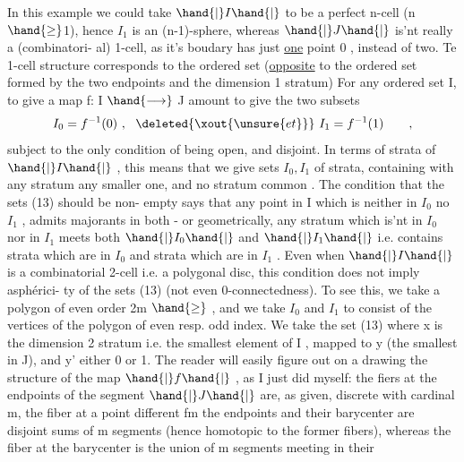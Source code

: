 In this example we could take $\hand{|}I\hand{|}$ to be a perfect n-cell (n$\hand{\geq}$1),
hence  $I_1$  is an (n-1)-sphere,  whereas $\hand{|}J\hand{|}$ is'nt really a (combinatori-%
al) 1-cell,  as it's boudary has just \uline{one} point 0 ,  instead of two.
Te 1-cell structure corresponds to the ordered set (\uline{opposite} to the
ordered set formed by the two endpoints and the dimension 1 stratum)
\diagram{\[ J = \begin{tikzcd}[row sep=small, column sep=small] & \over{y}{y} \ar[color=blue,dl] \ar[color=blue,dr] & \\ \over[typed]{0}{0} & & 1 \end{tikzcd} \quad . \]}
For any ordered set I,  to give a map  f: I $\hand{\longrightarrow}$ J  amount to give
the two subsets
\[ I_0 = f^{-1}(0) \ , \ \ \deleted{\xout{\unsure{et}}}\ I_1 = f^{-1}(1) \qquad , \]
subject to the only condition of being open,  and disjoint.  In terms
of strata of $\hand{|}I\hand{|}$ ,  this means that we give  sets $I_0,I_1$ of strata,
containing with any stratum any smaller one,  and  no stratum 
common .  The condition that the sets (13) should be non-%
empty says that any point in I which is neither in $I_0$ no $I_1$ , admits
majorants in both  -  or geometrically,  any stratum which is'nt in
$I_0$ nor in $I_1$ meets both $\hand{|}I_0\hand{|}$ and $\hand{|}I_1\hand{|}$ i.e. contains strata which are
in $I_0$ and strata which are in $I_1$ .   Even when $\hand{|}I\hand{|}$ is a combinatorial
2-cell i.e. a polygonal disc,  this condition does not imply asphérici-%
ty of the sets (13) (not even 0-connectedness).  To see this,  we take
a polygon of even order 2m $\hand{\geq}$ ,  and we take  $I_0$ and $I_1$ to consist
of the vertices of the polygon of even resp. odd index.  We take the
set (13) where x is the dimension 2 stratum  i.e. the  smallest
element of I ,  mapped to y (the smallest in J),  and y' either 0 or 1.
The reader will easily figure out on a drawing the structure of the
map $\hand{|}f\hand{|}$ ,  as I just did myself:  the fiers at the endpoints of the
segment $\hand{|}J\hand{|}$ are,  as given,  discrete with cardinal m,  the fiber at
a point different fm the endpoints and  their barycenter are disjoint
sums of m segments (hence homotopic to the former fibers),  whereas
the fiber at the barycenter is the union of m segments meeting in their


